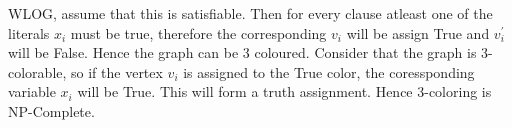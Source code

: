 \documentclass[a4paper, 11pt]{article}
\begin{document}
WLOG, assume that this is satisfiable. Then for every clause atleast one of the literals $x_i$ must be true, therefore the corresponding $v_i$ will be assign True and $v_i^{'}$ will be False. Hence the graph can be 3 coloured. Consider that the graph is 3-colorable, so if the vertex $v_i$ is assigned to the True color, the coressponding variable $x_i$ will be True. This will form a truth assignment. Hence 3-coloring is NP-Complete.
\end{document}
